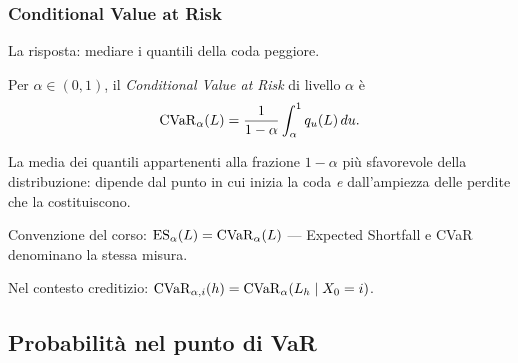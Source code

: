 \begin{frame}%
%

\frametitle{Conditional Value at Risk}%
%

%


La risposta: mediare i quantili della coda peggiore.

\medskip

Per $\alpha\in(0,1)$, il \emph{Conditional Value at Risk} di livello $\alpha$
\`{e}
\[
\operatorname{CVaR}_{\alpha}(L) = \frac{1}{1-\alpha} \int_{\alpha}^{1} q_{u}(L)\,du.
\]


\medskip

\begin{stepitemize}
\item La media dei quantili appartenenti alla frazione $1-\alpha$ pi\`{u}
sfavorevole della distribuzione: dipende dal punto in cui inizia la coda
\emph{e} dall'ampiezza delle perdite che la costituiscono.

\item Convenzione del corso: $\operatorname{ES}_{\alpha}(L)=\operatorname{CVaR}_{\alpha}(L)$
--- Expected Shortfall e CVaR denominano la stessa misura.

\item Nel contesto creditizio: $\operatorname{CVaR}_{\alpha,i}(h)=\operatorname{CVaR}_{\alpha}(L_{h}\mid
X_{0}=i)$.
\end{stepitemize}

%

\transboxout
\end{frame}%




\subsection{Probabilit\`{a} nel punto di VaR}%

